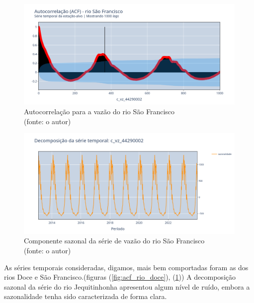 \begin{figure}[!h]
	\centering
	\includegraphics[scale=0.33]{Figuras/rio_sao_francisco/acf_sao_francisco.png}
	\caption{Autocorrelação para a vazão do rio São Francisco\\(fonte: o autor)}
	\label{fig:acf_rio_sao_francisco}
\end{figure}

\begin{figure}[!h]
	\centering
	\includegraphics[scale=0.33]{Figuras/rio_sao_francisco/decomposicao_serie_c_vz_44290002.png}
	\caption{Componente sazonal da série de vazão do rio São Francisco\\(fonte: o autor)}
	\label{fig:sazonalidade_rio_sao_francisco}
\end{figure}

As séries temporais consideradas, digamos, mais bem comportadas foram as dos rios Doce e São Francisco.(figuras (\ref{fig:acf_rio_doce}), (\ref{fig:acf_rio_sao_francisco})) A decomposição sazonal da série do rio Jequitinhonha apresentou algum nível de ruído, embora a sazonalidade tenha sido caracterizada de forma clara.

%

